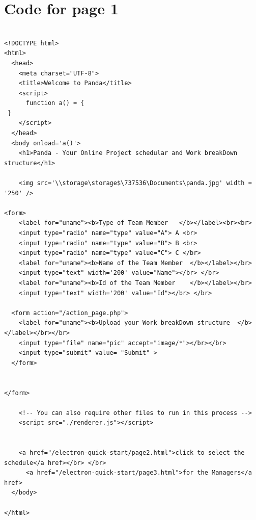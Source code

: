 \documentclass{article}
\begin{document}
\section *{Code for page 1}
\begin{verbatim}

<!DOCTYPE html>
<html>
  <head>
    <meta charset="UTF-8">
    <title>Welcome to Panda</title>
    <script>
      function a() = {
 }
    </script>
  </head>
  <body onload='a()'>
    <h1>Panda - Your Online Project schedular and Work breakDown structure</h1>
    
    <img src='\\storage\storage$\737536\Documents\panda.jpg' width = '250' />
    
<form>
    <label for="uname"><b>Type of Team Member   </b></label><br><br>
    <input type="radio" name="type" value="A"> A <br>
    <input type="radio" name="type" value="B"> B <br>
    <input type="radio" name="type" value="C"> C </br>
    <label for="uname"><b>Name of the Team Member  </b></label></br>
    <input type="text" width='200' value="Name"></br> </br>
    <label for="uname"><b>Id of the Team Member    </b></label></br>
    <input type="text" width='200' value="Id"></br> </br>

  <form action="/action_page.php">
    <label for="uname"><b>Upload your Work breakDown structure  </b></label></br></br>
    <input type="file" name="pic" accept="image/*"></br></br>
    <input type="submit" value= "Submit" >
  </form>

  
</form>

    <!-- You can also require other files to run in this process -->
    <script src="./renderer.js"></script>


    <a href="/electron-quick-start/page2.html">click to select the schedule</a href></br> </br>
      <a href="/electron-quick-start/page3.html">for the Managers</a href>
  </body>
  
</html>



\end{verbatim}
\end{document}
